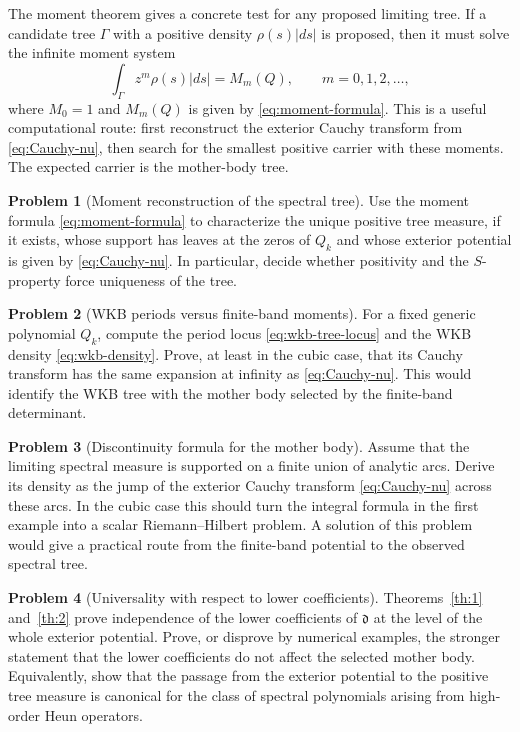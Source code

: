 \documentclass[10pt,twoside,a4paper,reqno]{amsart}
\theoremstyle{plain}
\theoremstyle{definition}
\newtheorem{pr}              {Problem}
\theoremstyle{remark}
\newenvironment{problem}{\begin{pr}}{\end{pr}}
\newcommand {\dq}{\mathfrak d}
\begin{document}
The moment theorem gives a concrete test for any proposed limiting tree.  If a candidate tree $\Gamma$ with a positive density $\rho(s)|ds|$ is proposed, then it must solve the infinite moment system
\[
        \int_\Gamma z^m\rho(s)|ds|=M_m(Q),\qquad m=0,1,2,\ldots,
\]
where $M_0=1$ and $M_m(Q)$ is given by \eqref{eq:moment-formula}.  This is a useful computational route: first reconstruct the exterior Cauchy transform from \eqref{eq:Cauchy-nu}, then search for the smallest positive carrier with these moments.  The expected carrier is the mother-body tree.

\begin{problem}[Moment reconstruction of the spectral tree]
Use the moment formula \eqref{eq:moment-formula} to characterize the unique positive tree measure, if it exists, whose support has leaves at the zeros of $Q_k$ and whose exterior potential is given by \eqref{eq:Cauchy-nu}.  In particular, decide whether positivity and the $S$-property force uniqueness of the tree.
\end{problem}

\begin{problem}[WKB periods versus finite-band moments]
For a fixed generic polynomial $Q_k$, compute the period locus \eqref{eq:wkb-tree-locus} and the WKB density \eqref{eq:wkb-density}.  Prove, at least in the cubic case, that its Cauchy transform has the same expansion at infinity as \eqref{eq:Cauchy-nu}.  This would identify the WKB tree with the mother body selected by the finite-band determinant.
\end{problem}

\begin{problem}[Discontinuity formula for the mother body]
Assume that the limiting spectral measure is supported on a finite union of analytic arcs.
Derive its density as the jump of the exterior Cauchy transform \eqref{eq:Cauchy-nu}
across these arcs.  In the cubic case this should turn the integral formula in the first
example into a scalar Riemann--Hilbert problem.  A solution of this problem would give a
practical route from the finite-band potential to the observed spectral tree.
\end{problem}

\begin{problem}[Universality with respect to lower coefficients]
Theorems~\ref{th:1} and~\ref{th:2} prove independence of the lower coefficients of $\dq$ at the level of the whole exterior potential.  Prove, or disprove by numerical examples, the stronger
statement that the lower coefficients do not affect the selected mother body.  Equivalently,
show that the passage from the exterior potential to the positive tree measure is canonical
for the class of spectral polynomials arising from high-order Heun operators.
\end{problem}
\end{document}
